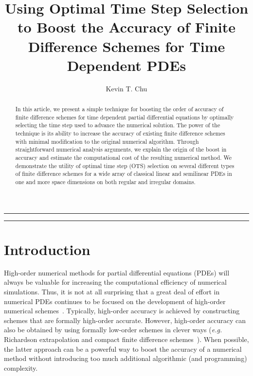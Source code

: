 \documentclass[fleqn,12pt,twoside]{article}
\def\eg{\emph{e.g. }}
\begin{document}


\title{Using Optimal Time Step Selection to Boost the Accuracy of
       Finite Difference Schemes for Time Dependent PDEs} 

\author{Kevin T. Chu\address{Serendipity Research, Mountain View, CA 94041, United States}
}


\maketitle

\noindent \rule{6.3in}{1pt}

\begin{abstract}
In this article, we present a simple technique for boosting the order of 
accuracy of finite difference schemes for time dependent 
partial differential equations by optimally selecting the time step used
to advance the numerical solution. The power of the technique is its ability
to increase the accuracy of existing finite difference schemes with 
minimal modification to the original numerical algorithm.  Through
straightforward numerical analysis arguments, we explain the origin of the
boost in accuracy and estimate the computational cost of the resulting
numerical method.  We demonstrate the utility of optimal time step (OTS)
selection on several different types of finite difference schemes
for a wide array of classical linear and semilinear PDEs in one and more space
dimensions on both regular and irregular domains.  
\end{abstract}

\noindent \rule{6.3in}{1pt}


\section{Introduction}
High-order numerical methods for partial differential equations (PDEs) will 
always be valuable for increasing the computational efficiency of numerical 
simulations.  Thus, it is not at all surprising that a great deal of effort in 
numerical PDEs continues to be focused on the development of high-order 
numerical 
schemes~\cite{spotz_2001,bruger_2005,gibou_2005,ito_2005,shukla_2005,heidenreich_2007,shukla_2007}.  
Typically, high-order accuracy is achieved by constructing
schemes that are formally high-order accurate.  However, high-order 
accuracy can also be obtained by using formally low-order schemes in clever 
ways (\eg Richardson extrapolation and compact finite difference 
schemes~\cite{spotz_2001}).  When possible, the latter approach can be a 
powerful way to boost the accuracy of a numerical method without
introducing too much additional algorithmic (and programming) complexity.
\end{document}

